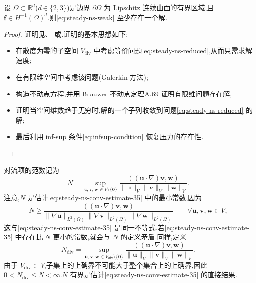 \begin{theorem}[解的存在性]\label{thm:steady-ns-existence}
设 $\Omega\subset\mathbb{R}^d$($d\in\{2,3\}$)是边界 $\partial\Omega$ 为 Lipschitz 连续曲面的有界区域,且 $\bm{f}\in H^{-1}(\Omega)^d$.则\cref{eq:steady-ns-weak} 至少存在一个解.
\end{theorem}

\begin{proof}
证明见\textcite[第 IV 章,定理 2.3 和 2.4]{GiraultRaviart1986}、\textcite[第 IX.3 章]{Galdi2011} 或\textcite[第 II 章,定理 1.2]{Temam1984}.证明的基本思想如下:
\begin{itemize}
  \item 在散度为零的子空间 $V_{\mathrm{div}}$ 中考虑等价问题\cref{eq:steady-ns-reduced},从而只需求解速度;
  \item 在有限维空间中考虑该问题(Galerkin 方法);
  \item 构造不动点方程,并用 Brouwer 不动点定理\hyperref[thm:appendix-a-69]{A.69} 证明有限维问题存在解;
  \item 证明当空间维数趋于无穷时,解的一个子列收敛到问题\cref{eq:steady-ns-reduced} 的解;
  \item 最后利用 inf-sup 条件\cref{eq:infsup-condition} 恢复压力的存在性.
\end{itemize}
\end{proof}

\begin{note}[对流项三线性型的范数]\label{note:steady-ns-trilinear-norm}
对流项的范数记为
\[
  N=\sup_{\bm{u},\bm{v},\bm{w}\in V\setminus\{\bm{0}\}}
     \frac{((\bm{u}\cdot\nabla)\bm{v},\bm{w})}
          {\|\bm{u}\|_V\|\bm{v}\|_V\|\bm{w}\|_V}.
\]
注意,$N$ 是估计\cref{eq:steady-ns-conv-estimate-35} 中的最小常数,因为
\[
  N\ge
  \frac{((\bm{u}\cdot\nabla)\bm{v},\bm{w})}
       {\|\nabla\bm{u}\|_{L^2(\Omega)}
        \|\nabla\bm{v}\|_{L^2(\Omega)}
        \|\nabla\bm{w}\|_{L^2(\Omega)}}
  \qquad\forall\bm{u},\bm{v},\bm{w}\in V,
\]
这与\cref{eq:steady-ns-conv-estimate-35} 是同一不等式.若\cref{eq:steady-ns-conv-estimate-35} 中存在比 $N$ 更小的常数,就会与 $N$ 的定义矛盾.同样,定义
\begin{equation}\label{eq:steady-ns-ndiv-norm}
  N_{\mathrm{div}}=
  \sup_{\bm{u},\bm{v},\bm{w}\in V_{\mathrm{div}}\setminus\{\bm{0}\}}
     \frac{((\bm{u}\cdot\nabla)\bm{v},\bm{w})}
          {\|\bm{u}\|_V\|\bm{v}\|_V\|\bm{w}\|_V}.
\end{equation}
由于 $V_{\mathrm{div}}\subset V$,子集上的上确界不可能大于整个集合上的上确界,因此 $0<N_{\mathrm{div}}\le N<\infty$.$N$ 有界是估计\cref{eq:steady-ns-conv-estimate-35} 的直接结果.
\end{note}


